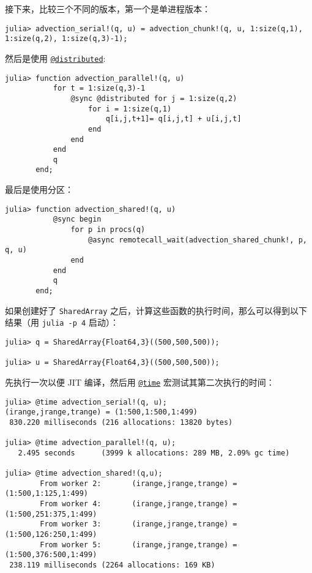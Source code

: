 接下来，比较三个不同的版本，第一个是单进程版本：




\begin{verbatim}
julia> advection_serial!(q, u) = advection_chunk!(q, u, 1:size(q,1), 1:size(q,2), 1:size(q,3)-1);
\end{verbatim}



然后是使用 \hyperlink{4581929266257108937}{\texttt{@distributed}}:




\begin{verbatim}
julia> function advection_parallel!(q, u)
           for t = 1:size(q,3)-1
               @sync @distributed for j = 1:size(q,2)
                   for i = 1:size(q,1)
                       q[i,j,t+1]= q[i,j,t] + u[i,j,t]
                   end
               end
           end
           q
       end;
\end{verbatim}



最后是使用分区：




\begin{verbatim}
julia> function advection_shared!(q, u)
           @sync begin
               for p in procs(q)
                   @async remotecall_wait(advection_shared_chunk!, p, q, u)
               end
           end
           q
       end;
\end{verbatim}



如果创建好了 \texttt{SharedArray} 之后，计算这些函数的执行时间，那么可以得到以下结果（用 \texttt{julia -p 4} 启动）：




\begin{verbatim}
julia> q = SharedArray{Float64,3}((500,500,500));

julia> u = SharedArray{Float64,3}((500,500,500));
\end{verbatim}



先执行一次以便 JIT 编译，然后用 \hyperlink{8029752041511656628}{\texttt{@time}} 宏测试其第二次执行的时间：




\begin{verbatim}
julia> @time advection_serial!(q, u);
(irange,jrange,trange) = (1:500,1:500,1:499)
 830.220 milliseconds (216 allocations: 13820 bytes)

julia> @time advection_parallel!(q, u);
   2.495 seconds      (3999 k allocations: 289 MB, 2.09% gc time)

julia> @time advection_shared!(q,u);
        From worker 2:       (irange,jrange,trange) = (1:500,1:125,1:499)
        From worker 4:       (irange,jrange,trange) = (1:500,251:375,1:499)
        From worker 3:       (irange,jrange,trange) = (1:500,126:250,1:499)
        From worker 5:       (irange,jrange,trange) = (1:500,376:500,1:499)
 238.119 milliseconds (2264 allocations: 169 KB)
\end{verbatim}



